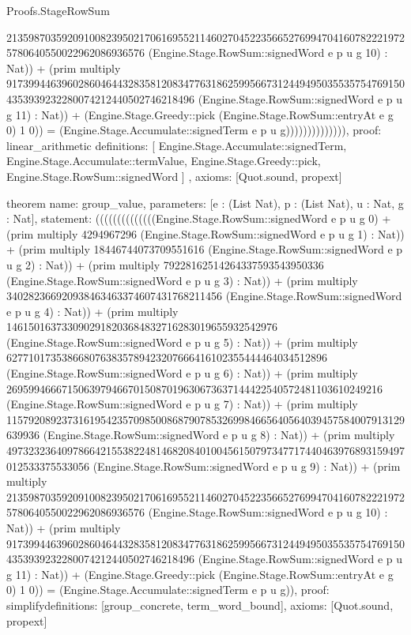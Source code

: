 \begin{lexlean}{Proofs.StageRowSum}
\begin{semanticmodule}
{2135987035920910082395021706169552114602704522356652769947041607822219725780640550022962086936576 (Engine.Stage.RowSum::signedWord e p u g 10) : Nat)) + (prim multiply 9173994463960286046443283581208347763186259956673124494950355357547691504353939232280074212440502746218496 (Engine.Stage.RowSum::signedWord e p u g 11) : Nat)) + (Engine.Stage.Greedy::pick (Engine.Stage.RowSum::entryAt e g 0) 1 0)) = (Engine.Stage.Accumulate::signedTerm e p u g)))))))))))))),
  proof: linear_arithmetic{
    definitions: [
      Engine.Stage.Accumulate::signedTerm,
      Engine.Stage.Accumulate::termValue,
      Engine.Stage.Greedy::pick,
      Engine.Stage.RowSum::signedWord
    ]
  },
  axioms: [Quot.sound, propext]
}

theorem{
  name: group_value,
  parameters: [e : (List Nat), p : (List Nat), u : Nat, g : Nat],
  statement: ((((((((((((((Engine.Stage.RowSum::signedWord e p u g 0) + (prim multiply 4294967296 (Engine.Stage.RowSum::signedWord e p u g 1) : Nat)) + (prim multiply 18446744073709551616 (Engine.Stage.RowSum::signedWord e p u g 2) : Nat)) + (prim multiply 79228162514264337593543950336 (Engine.Stage.RowSum::signedWord e p u g 3) : Nat)) + (prim multiply 340282366920938463463374607431768211456 (Engine.Stage.RowSum::signedWord e p u g 4) : Nat)) + (prim multiply 1461501637330902918203684832716283019655932542976 (Engine.Stage.RowSum::signedWord e p u g 5) : Nat)) + (prim multiply 6277101735386680763835789423207666416102355444464034512896 (Engine.Stage.RowSum::signedWord e p u g 6) : Nat)) + (prim multiply 26959946667150639794667015087019630673637144422540572481103610249216 (Engine.Stage.RowSum::signedWord e p u g 7) : Nat)) + (prim multiply 115792089237316195423570985008687907853269984665640564039457584007913129639936 (Engine.Stage.RowSum::signedWord e p u g 8) : Nat)) + (prim multiply 497323236409786642155382248146820840100456150797347717440463976893159497012533375533056 (Engine.Stage.RowSum::signedWord e p u g 9) : Nat)) + (prim multiply 2135987035920910082395021706169552114602704522356652769947041607822219725780640550022962086936576 (Engine.Stage.RowSum::signedWord e p u g 10) : Nat)) + (prim multiply 9173994463960286046443283581208347763186259956673124494950355357547691504353939232280074212440502746218496 (Engine.Stage.RowSum::signedWord e p u g 11) : Nat)) + (Engine.Stage.Greedy::pick (Engine.Stage.RowSum::entryAt e g 0) 1 0)) = (Engine.Stage.Accumulate::signedTerm e p u g)),
  proof: simplify{definitions: [group_concrete, term_word_bound]},
  axioms: [Quot.sound, propext]
}


\end{semanticmodule}
\end{lexlean}
